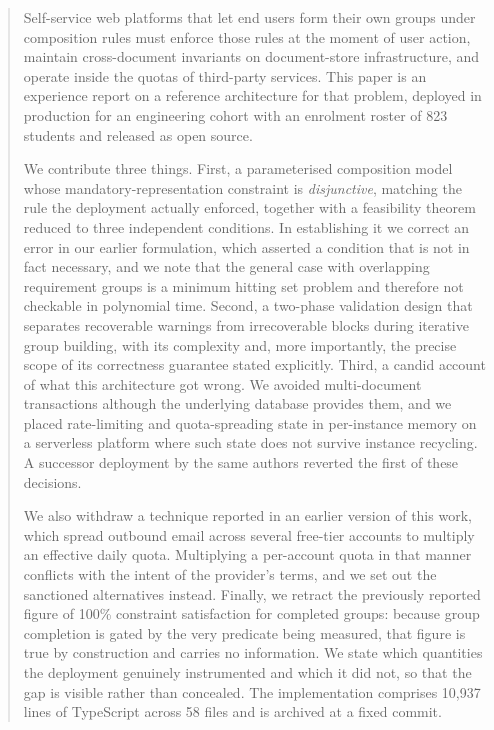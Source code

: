 \documentclass[11pt,a4paper]{article}
\theoremstyle{plain}
\theoremstyle{definition}
\theoremstyle{remark}
\begin{document}
\begin{abstract}
Self-service web platforms that let end users form their own groups under composition rules must enforce those rules at the moment of user action, maintain cross-document invariants on document-store infrastructure, and operate inside the quotas of third-party services. This paper is an experience report on a reference architecture for that problem, deployed in production for an engineering cohort with an enrolment roster of 823 students and released as open source.

We contribute three things. First, a parameterised composition model whose mandatory-representation constraint is \emph{disjunctive}, matching the rule the deployment actually enforced, together with a feasibility theorem reduced to three independent conditions. In establishing it we correct an error in our earlier formulation, which asserted a condition that is not in fact necessary, and we note that the general case with overlapping requirement groups is a minimum hitting set problem and therefore not checkable in polynomial time. Second, a two-phase validation design that separates recoverable warnings from irrecoverable blocks during iterative group building, with its complexity and, more importantly, the precise scope of its correctness guarantee stated explicitly. Third, a candid account of what this architecture got wrong. We avoided multi-document transactions although the underlying database provides them, and we placed rate-limiting and quota-spreading state in per-instance memory on a serverless platform where such state does not survive instance recycling. A successor deployment by the same authors reverted the first of these decisions.

We also withdraw a technique reported in an earlier version of this work, which spread outbound email across several free-tier accounts to multiply an effective daily quota. Multiplying a per-account quota in that manner conflicts with the intent of the provider's terms, and we set out the sanctioned alternatives instead. Finally, we retract the previously reported figure of 100\% constraint satisfaction for completed groups: because group completion is gated by the very predicate being measured, that figure is true by construction and carries no information. We state which quantities the deployment genuinely instrumented and which it did not, so that the gap is visible rather than concealed. The implementation comprises 10,937 lines of TypeScript across 58 files and is archived at a fixed commit.
\end{abstract}
\end{document}
